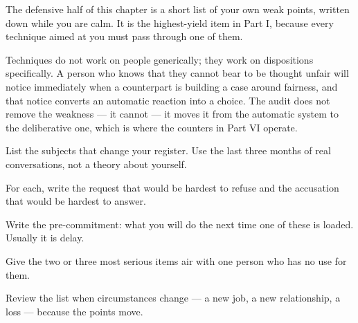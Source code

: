 


\begin{core}
The defensive half of this chapter is a short list of your own weak points, written down while you are calm. It is the highest-yield item in Part I, because every technique aimed at you must pass through one of them.
\end{core}

\begin{mechanism}
Techniques do not work on people generically; they work on dispositions specifically. A person who knows that they cannot bear to be thought unfair will notice immediately when a counterpart is building a case around fairness, and that notice converts an automatic reaction into a choice. The audit does not remove the weakness --- it cannot --- it moves it from the automatic system to the deliberative one, which is where the counters in Part VI operate.
\end{mechanism}

\begin{application}
  \item List the subjects that change your register. Use the last three months of real conversations, not a theory about yourself.
  \item For each, write the request that would be hardest to refuse and the accusation that would be hardest to answer.
  \item Write the pre-commitment: what you will do the next time one of these is loaded. Usually it is delay.
  \item Give the two or three most serious items air with one person who has no use for them.
  \item Review the list when circumstances change --- a new job, a new relationship, a loss --- because the points move.
\end{application}

